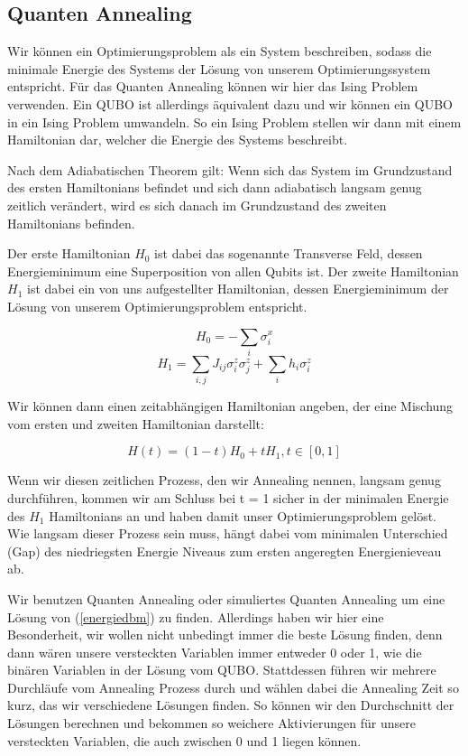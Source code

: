 \subsection{Quanten Annealing}
\label{subsec:QA}

Wir können ein Optimierungsproblem als ein System beschreiben, sodass die minimale Energie des Systems der Lösung von unserem Optimierungssystem entspricht.
Für das Quanten Annealing können wir hier das Ising Problem verwenden. Ein QUBO ist allerdings äquivalent dazu und wir können ein QUBO in ein Ising Problem umwandeln.
So ein Ising Problem stellen wir dann mit einem Hamiltonian dar, welcher die Energie des Systems beschreibt.

Nach dem Adiabatischen Theorem gilt: Wenn sich das System im Grundzustand des ersten Hamiltonians befindet und sich dann adiabatisch langsam genug zeitlich verändert, wird es sich danach im Grundzustand des zweiten Hamiltonians befinden. 

Der erste Hamiltonian $H_{0}$ ist dabei das sogenannte Transverse Feld, dessen Energieminimum eine Superposition von allen Qubits ist. 
Der zweite Hamiltonian $H_{1}$ ist dabei ein von uns aufgestellter Hamiltonian, dessen Energieminimum der Lösung von unserem Optimierungsproblem entspricht.

\begin{equation}
    H_{0} = - \sum_{i} \sigma^{x}_{i}
 \end{equation}
\begin{equation}
    H_{1} = \sum_{i, j} J_{ij} \sigma^{z}_{i}  \sigma^{z}_{j}  + \sum_{i} h_i \sigma^{z}_{i}
 \end{equation}

Wir können dann einen zeitabhängigen Hamiltonian angeben, der eine Mischung vom ersten und zweiten Hamiltonian darstellt:

\begin{equation}
    H(t) = (1-t) H_{0} + t H_{1} , t \in [0,1]
 \end{equation}

Wenn wir diesen zeitlichen Prozess, den wir Annealing nennen, langsam genug durchführen, kommen wir am Schluss bei t = 1 sicher in der minimalen Energie des $H_{1}$ Hamiltonians an und haben damit unser Optimierungsproblem gelöst.
Wie langsam dieser Prozess sein muss, hängt dabei vom minimalen Unterschied (Gap) des niedriegsten Energie Niveaus zum ersten angeregten Energienieveau ab.

Wir benutzen Quanten Annealing oder simuliertes Quanten Annealing um eine Lösung von (\ref{energiedbm}) zu finden. Allerdings haben wir hier eine Besonderheit, wir wollen nicht unbedingt immer die beste Lösung finden, denn dann wären unsere versteckten Variablen immer entweder 0 oder 1, wie die binären Variablen in der Lösung vom QUBO. Stattdessen führen wir mehrere Durchläufe vom Annealing Prozess durch und wählen dabei die Annealing Zeit so kurz, das wir verschiedene Lösungen finden. So können wir den Durchschnitt der Lösungen berechnen und bekommen so weichere Aktivierungen für unsere versteckten Variablen, die auch zwischen 0 und 1 liegen können.

